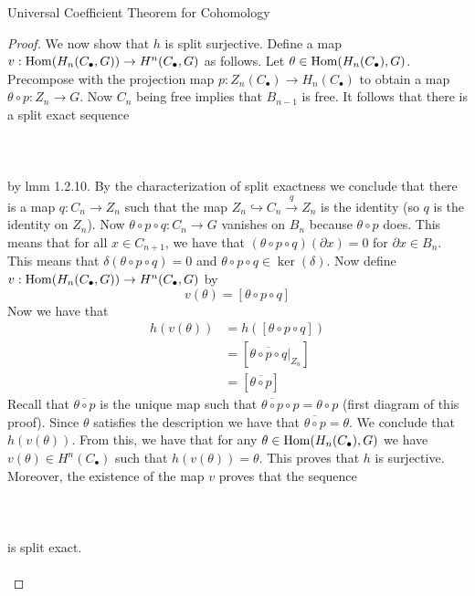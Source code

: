 \documentclass[a4paper]{article}
\begin{document}
\begin{thm}{Universal Coefficient Theorem for Cohomology}{}
\begin{proof}
We now show that $h$ is split surjective. Define a map $v:\operatorname{Hom}(H_n(C_\bullet,G))\to H^n(C_\bullet,G)$ as follows. Let $\theta\in\operatorname{Hom}(H_n(C_\bullet),G)$. Precompose with the projection map $p:Z_n(C_\bullet)\to H_n(C_\bullet)$ to obtain a map $\theta\circ p:Z_n\to G$.
Now $C_n$ being free implies that $B_{n-1}$ is free. It follows that there is a split exact sequence \\~\\
\\~\\
by lmm 1.2.10. By the characterization of split exactness we conclude that there is a map $q:C_n\to Z_n$ such that the map $Z_n\hookrightarrow C_n\overset{q}{\longrightarrow}Z_n$ is the identity (so $q$ is the identity on $Z_n$). Now $\theta\circ p\circ q:C_n\to G$ vanishes on $B_n$ because $\theta\circ p$ does. This means that for all $x\in C_{n+1}$, we have that $(\theta\circ p\circ q)(\partial x)=0$ for $\partial x\in B_n$. This means that $\delta(\theta\circ p\circ q)=0$ and $\theta\circ p\circ q\in\ker(\delta)$. Now define $v:\operatorname{Hom}(H_n(C_\bullet,G))\to H^n(C_\bullet,G)$ by $$v(\theta)=[\theta\circ p\circ q]$$ Now we have that 
\begin{align*}
h(v(\theta))&=h([\theta\circ p\circ q])\\
&=[\overline{\theta\circ p\circ q}|_{Z_n}]\\
&=[\overline{\theta\circ p}]\tag{$q$ is the identity on $Z_n$}
\end{align*}
Recall that $\overline{\theta\circ p}$ is the unique map such that $\overline{\theta\circ p}\circ p=\theta\circ p$ (first diagram of this proof). Since $\theta$ satisfies the description we have that $\overline{\theta\circ p}=\theta$. We conclude that $h(v(\theta))$. From this, we have that for any $\theta\in\operatorname{Hom}(H_n(C_\bullet),G)$ we have $v(\theta)\in H^n(C_\bullet)$ such that $h(v(\theta))=\theta$. This proves that $h$ is surjective. Moreover, the existence of the map $v$ proves that the sequence \\~\\
\\~\\
is split exact. \\~\\


\end{proof}
\end{thm}
\end{document}

